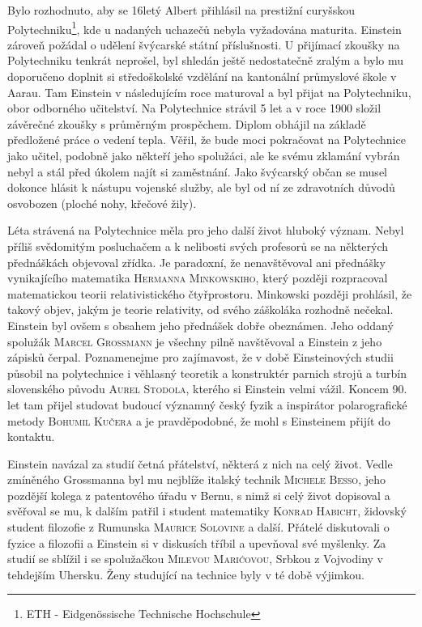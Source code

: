        Bylo rozhodnuto, aby se 16letý Albert přihlásil na prestižní curyšskou
        Polytechniku\footnote{ETH - Eidgenössische Technische Hochschule}, kde u nadaných uchazečů
        nebyla vyžadována maturita. Einstein zároveň požádal o udělení švýcarské státní
        příslušnosti. U přijímací zkoušky na Polytechniku tenkrát neprošel, byl shledán ještě
        nedostatečně zralým a bylo mu doporučeno doplnit si středoškolské vzdělání na kantonální
        průmyslové škole v Aarau. Tam Einstein v následujícím roce maturoval a byl přijat na
        Polytechniku, obor odborného učitelství. Na Polytechnice strávil 5 let a v roce 1900 složil
        závěrečné zkoušky s průměrným prospěchem. Diplom obhájil na základě předložené práce o
        vedení tepla. Věřil, že bude moci pokračovat na Polytechnice jako učitel, podobně jako
        někteří jeho spolužáci, ale ke svému zklamání vybrán nebyl a stál před úkolem najít si
        zaměstnání. Jako švýcarský občan se musel dokonce hlásit k nástupu vojenské služby, ale byl
        od ní ze zdravotních důvodů osvobozen (ploché nohy, křečové žily).

        Léta strávená na Polytechnice měla pro jeho další život hluboký význam. Nebyl příliš
        svědomitým posluchačem a k nelibosti svých profesorů se na některých přednáškách objevoval
        zřídka. Je paradoxní, že nenavštěvoval ani přednášky vynikajícího matematika
        \textsc{Hermanna Minkowskiho}, který později rozpracoval matematickou teorii
        relativistického čtyřprostoru. Minkowski později prohlásil, že takový objev, jakým je teorie
        relativity, od svého záškoláka rozhodně nečekal. Einstein byl ovšem s obsahem jeho přednášek
        dobře obeznámen. Jeho oddaný spolužák \textsc{Marcel Grossmann} je všechny pilně navštěvoval
        a Einstein z jeho zápisků čerpal. Poznamenejme pro zajímavost, že v době Einsteinových
        studii působil na polytechnice i věhlasný teoretik a konstruktér parnich strojů a turbín
        slovenského původu \textsc{Aurel Stodola}, kterého si Einstein velmi vážil. Koncem 90. let
        tam přijel studovat budoucí významný český fyzik a inspirátor polarografické metody
        \textsc{Bohumil Kučera} a je pravděpodobné, že mohl s Einsteinem přijít do kontaktu.

        Einstein navázal za studií četná přátelství, některá z nich na celý život. Vedle zmíněného
        Grossmanna byl mu nejblíže italský technik \textsc{Michele Besso}, jeho pozdější kolega z
        patentového úřadu v Bernu, s nimž si celý život dopisoval a svěřoval se mu, k dalším patřil
        i student matematiky \textsc{Konrad Habicht}, židovský student filozofie z Rumunska
        \textsc{Maurice Solovine} a další. Přátelé diskutovali o fyzice a filozofii a Einstein si v
        diskusích tříbil a upevňoval své myšlenky. Za studií se sblížil i se spolužačkou
        \textsc{Milevou Marićovou}, Srbkou z Vojvodiny v tehdejším Uhersku. Ženy studující na
        technice byly v té době výjimkou.

